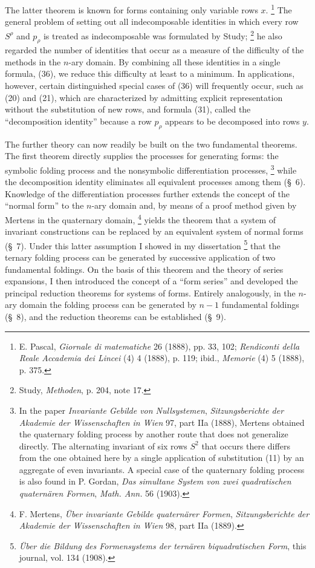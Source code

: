 \documentclass[11pt]{article}
\newcommand{\NoetherSrcNote}[2]{%
  \begingroup
  \renewcommand{\thefootnote}{\ensuremath{[\mathrm{#1}]}}%
  \footnote{#2}%
  \endgroup
}
\begin{document}
The latter theorem is known for forms containing only variable rows $x$.\NoetherSrcNote{120:*}{E. Pascal, \emph{Giornale di matematiche} 26 (1888), pp. 33, 102; \emph{Rendiconti della Reale Accademia dei Lincei} (4) 4 (1888), p. 119; ibid., \emph{Memorie} (4) 5 (1888), p. 375.} The general problem of setting out all indecomposable identities in which every row $S^\rho$ and $p_\rho$ is treated as indecomposable was formulated by Study;\NoetherSrcNote{120:**}{Study, \emph{Methoden}, p. 204, note 17.} he also regarded the number of identities that occur as a measure of the difficulty of the methods in the $n$-ary domain. By combining all these identities in a single formula, (36), we reduce this difficulty at least to a minimum. In applications, however, certain distinguished special cases of (36) will frequently occur, such as (20) and (21), which are characterized by admitting explicit representation without the substitution of new rows, and formula (31), called the ``decomposition identity'' because a row $p_\rho$ appears to be decomposed into rows $y$.

The further theory can now readily be built on the two fundamental theorems. The first theorem directly supplies the processes for generating forms: the symbolic folding process and the nonsymbolic differentiation processes,\NoetherSrcNote{120:***}{In the paper \emph{Invariante Gebilde von Nullsystemen}, \emph{Sitzungsberichte der Akademie der Wissenschaften in Wien} 97, part IIa (1888), Mertens obtained the quaternary folding process by another route that does not generalize directly. The alternating invariant of six rows $S^2$ that occurs there differs from the one obtained here by a single application of substitution (11) by an aggregate of even invariants. A special case of the quaternary folding process is also found in P. Gordan, \emph{Das simultane System von zwei quadratischen quatern\"aren Formen}, \emph{Math. Ann.} 56 (1903).} while the decomposition identity eliminates all equivalent processes among them (\S\ 6). Knowledge of the differentiation processes further extends the concept of the ``normal form'' to the $n$-ary domain and, by means of a proof method given by Mertens in the quaternary domain,\NoetherSrcNote{121:*}{F. Mertens, \emph{\"Uber invariante Gebilde quatern\"arer Formen}, \emph{Sitzungsberichte der Akademie der Wissenschaften in Wien} 98, part IIa (1889).} yields the theorem that a system of invariant constructions can be replaced by an equivalent system of normal forms (\S\ 7). Under this latter assumption I showed in my dissertation\NoetherSrcNote{121:**}{\emph{\"Uber die Bildung des Formensystems der tern\"aren biquadratischen Form}, this journal, vol. 134 (1908).} that the ternary folding process can be generated by successive application of two fundamental foldings. On the basis of this theorem and the theory of series expansions, I then introduced the concept of a ``form series'' and developed the principal reduction theorems for systems of forms. Entirely analogously, in the $n$-ary domain the folding process can be generated by $n-1$ fundamental foldings (\S\ 8), and the reduction theorems can be established (\S\ 9).
\end{document}
